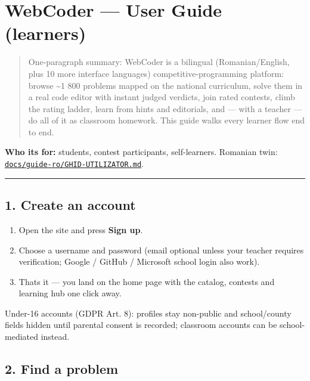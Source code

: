 \documentclass[
]{article}
\author{}
\date{}
\providecommand{\tightlist}{%
  \setlength{\itemsep}{0pt}\setlength{\parskip}{0pt}}
\begin{document}
{
\setcounter{tocdepth}{2}
\tableofcontents
}
\section{WebCoder --- User Guide
(learners)}\label{webcoder--user-guide-learners}

\begin{quote}
One-paragraph summary: WebCoder is a bilingual (Romanian/English, plus
10 more interface languages) competitive-programming platform: browse
\textasciitilde1 800 problems mapped on the national curriculum, solve
them in a real code editor with instant judged verdicts, join rated
contests, climb the rating ladder, learn from hints and editorials, and
--- with a teacher --- do all of it as classroom homework. This guide
walks every learner flow end to end.
\end{quote}

\textbf{Who it\textquotesingle s for:} students, contest participants,
self-learners. Romanian twin:
\href{../guide-ro/GHID-UTILIZATOR.md}{\texttt{docs/guide-ro/GHID-UTILIZATOR.md}}.

\begin{center}\rule{0.5\linewidth}{0.5pt}\end{center}

\subsection{1. Create an account}\label{1-create-an-account}

\begin{enumerate}
\def\labelenumi{\arabic{enumi}.}
\tightlist
\item
  Open the site and press \textbf{Sign up}.
\item
  Choose a username and password (email optional unless your teacher
  requires verification; Google / GitHub / Microsoft school login also
  work).
\item
  That\textquotesingle s it --- you land on the home page with the
  catalog, contests and learning hub one click away.
\end{enumerate}

Under-16 accounts (GDPR Art. 8): profiles stay non-public and
school/county fields hidden until parental consent is recorded;
classroom accounts can be school-mediated instead.

\subsection{2. Find a problem}\label{2-find-a-problem}
\end{document}
